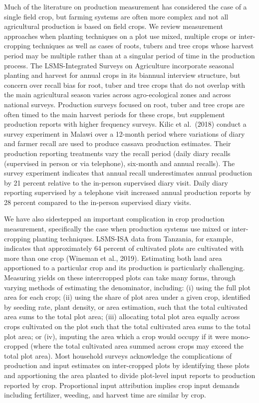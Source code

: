 \documentclass[
]{book}
\begin{document}
Much of the literature on production measurement has considered the case of a single field crop, but farming systems are often more complex and not all agricultural production is based on field crops. We review measurement approaches when planting techniques on a plot use mixed, multiple crops or inter-cropping techniques as well as cases of roots, tubers and tree crops whose harvest period may be multiple rather than at a singular period of time in the production process. The LSMS-Integrated Surveys on Agriculture incorporate seasonal planting and harvest for annual crops in its biannual interview structure, but concern over recall bias for root, tuber and tree crops that do not overlap with the main agricultural season varies across agro-ecological zones and across national surveys. Production surveys focused on root, tuber and tree crops are often timed to the main harvest periods for these crops, but supplement production reports with higher frequency surveys. Kilic et al.~(2018) conduct a survey experiment in Malawi over a 12-month period where variations of diary and farmer recall are used to produce cassava production estimates. Their production reporting treatments vary the recall period (daily diary recalls (supervised in person or via telephone), six-month and annual recalls). The survey experiment indicates that annual recall underestimates annual production by 21 percent relative to the in-person supervised diary visit. Daily diary reporting supervised by a telephone visit increased annual production reports by 28 percent compared to the in-person supervised diary visits.

We have also sidestepped an important complication in crop production measurement, specifically the case when production systems use mixed or inter-cropping planting techniques. LSMS-ISA data from Tanzania, for example, indicates that approximately 64 percent of cultivated plots are cultivated with more than one crop (Wineman et al., 2019). Estimating both land area apportioned to a particular crop and its production is particularly challenging. Measuring yields on these intercropped plots can take many forms, through varying methods of estimating the denominator, including: (i) using the full plot area for each crop; (ii) using the share of plot area under a given crop, identified by seeding rate, plant density, or area estimation, such that the total cultivated area sums to the total plot area; (iii) allocating total plot area equally across crops cultivated on the plot such that the total cultivated area sums to the total plot area; or (iv), imputing the area which a crop would occupy if it were mono-cropped (where the total cultivated area summed across crops may exceed the total plot area). Most household surveys acknowledge the complications of production and input estimates on inter-cropped plots by identifying these plots and apportioning the area planted to divide plot-level input reports to production reported by crop. Proportional input attribution implies crop input demands including fertilizer, weeding, and harvest time are similar by crop.
\end{document}
